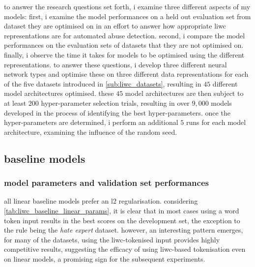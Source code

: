 to answer the research questions set forth, i examine three different aspects of my models: first, i examine the model performances on a held out evaluation set from dataset they are optimised on in an effort to answer how appropriate liwc representations are for automated abuse detection.
second, i compare the model performances on the evaluation sets of datasets that they are not optimised on. 
finally, i observe the time it takes for models to be optimised using the different representations.
to answer these questions, i develop three different neural network types and optimise these on three different data representations for each of the five datasets introduced in \cref{sub:liwc_datasets}, resulting in $45$ different model architectures optimised.
these $45$ model architectures are then subject to at least $200$ hyper-parameter selection trials, resulting in over $9,000$ models developed in the process of identifying the best hyper-parameters.
once the hyper-parameters are determined, i perform an additional $5$ runs for each model architecture, examining the influence of the random seed.

\subsection{baseline models}

\subsubsection{model parameters and validation set performances}
all linear baseline models prefer an l2 regularisation.
considering \cref{tab:liwc_baseline_linear_params}, it is clear that in most cases using a word token input results in the best scores on the development set, the exception to the rule being the \textit{hate expert} dataset.
however, an interesting pattern emerges, for many of the datasets, using the liwc-tokenised input provides highly competitive results, suggesting the efficacy of using liwc-based tokenisation even on linear models, a promising sign for the subsequent experiments.

